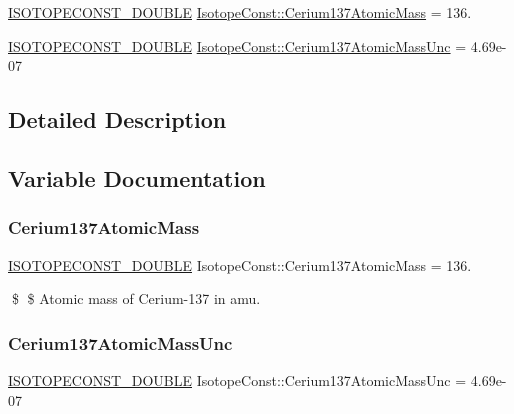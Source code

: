 \begin{DoxyCompactItemize}
\item 
\mbox{\hyperlink{group___isotope_const-_macros_ga8f45a7272ce02c0b4c65c44636ed719a}{I\+S\+O\+T\+O\+P\+E\+C\+O\+N\+S\+T\+\_\+\+D\+O\+U\+B\+LE}} \mbox{\hyperlink{group___isotope_const-_cerium-_ce137_ga476d0876c212fd01de7a95039a99797a}{Isotope\+Const\+::\+Cerium137\+Atomic\+Mass}} = 136.
\item 
\mbox{\hyperlink{group___isotope_const-_macros_ga8f45a7272ce02c0b4c65c44636ed719a}{I\+S\+O\+T\+O\+P\+E\+C\+O\+N\+S\+T\+\_\+\+D\+O\+U\+B\+LE}} \mbox{\hyperlink{group___isotope_const-_cerium-_ce137_ga2adf5955f1e54ced599f9d6435808dc7}{Isotope\+Const\+::\+Cerium137\+Atomic\+Mass\+Unc}} = 4.\+69e-\/07
\end{DoxyCompactItemize}


\subsection{Detailed Description}


\subsection{Variable Documentation}
\mbox{\label{group___isotope_const-_cerium-_ce137_ga476d0876c212fd01de7a95039a99797a}} 
\subsubsection{\texorpdfstring{Cerium137\+Atomic\+Mass}{Cerium137AtomicMass}}
{\footnotesize\ttfamily \mbox{\hyperlink{group___isotope_const-_macros_ga8f45a7272ce02c0b4c65c44636ed719a}{I\+S\+O\+T\+O\+P\+E\+C\+O\+N\+S\+T\+\_\+\+D\+O\+U\+B\+LE}} Isotope\+Const\+::\+Cerium137\+Atomic\+Mass = 136.}

\$ \$ Atomic mass of Cerium-\/137 in amu. \mbox{\label{group___isotope_const-_cerium-_ce137_ga2adf5955f1e54ced599f9d6435808dc7}} 
\subsubsection{\texorpdfstring{Cerium137\+Atomic\+Mass\+Unc}{Cerium137AtomicMassUnc}}
{\footnotesize\ttfamily \mbox{\hyperlink{group___isotope_const-_macros_ga8f45a7272ce02c0b4c65c44636ed719a}{I\+S\+O\+T\+O\+P\+E\+C\+O\+N\+S\+T\+\_\+\+D\+O\+U\+B\+LE}} Isotope\+Const\+::\+Cerium137\+Atomic\+Mass\+Unc = 4.\+69e-\/07}

